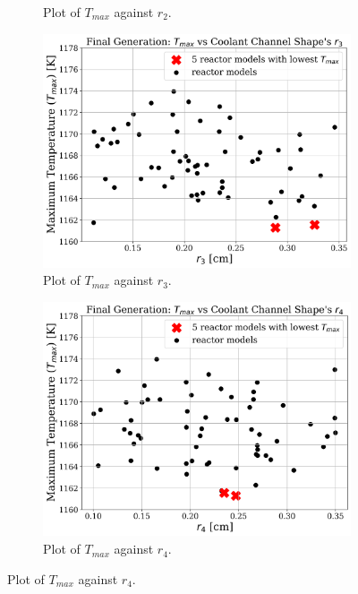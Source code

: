 \begin{frame}
\begin{figure}
\begin{subfigure}{0.3\textwidth}
            \caption{Plot of $T_{max}$ against $r_2$.}
            \label{fig:a-1e-r2} 
        \end{subfigure}
        \begin{subfigure}{0.3\textwidth}
            \includegraphics[width=\linewidth]{../docs/figures/a-1e-r3.png}
            \caption{Plot of $T_{max}$ against $r_3$.}
            \label{fig:a-1e-r3} 
        \end{subfigure}
        \begin{subfigure}{0.3\textwidth}
            \includegraphics[width=\linewidth]{../docs/figures/a-1e-r4.png}
            \caption{Plot of $T_{max}$ against $r_4$.}
            \label{fig:a-1e-r4} 
        \end{subfigure}

\end{figure}
\end{frame}
